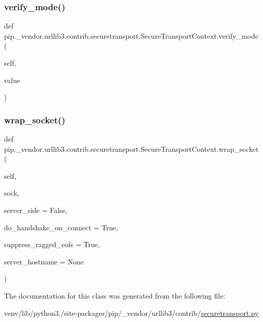 \subsubsection{\texorpdfstring{verify\+\_\+mode()}{verify\_mode()}\hspace{0.1cm}{\footnotesize\ttfamily [2/2]}}
{\footnotesize\ttfamily def pip.\+\_\+vendor.\+urllib3.\+contrib.\+securetransport.\+Secure\+Transport\+Context.\+verify\+\_\+mode (\begin{DoxyParamCaption}\item[{}]{self,  }\item[{}]{value }\end{DoxyParamCaption})}

\mbox{\label{classpip_1_1__vendor_1_1urllib3_1_1contrib_1_1securetransport_1_1SecureTransportContext_a0d4b10fc19b24ab873ace5e8804a5729}} 
\subsubsection{\texorpdfstring{wrap\+\_\+socket()}{wrap\_socket()}}
{\footnotesize\ttfamily def pip.\+\_\+vendor.\+urllib3.\+contrib.\+securetransport.\+Secure\+Transport\+Context.\+wrap\+\_\+socket (\begin{DoxyParamCaption}\item[{}]{self,  }\item[{}]{sock,  }\item[{}]{server\+\_\+side = {\ttfamily False},  }\item[{}]{do\+\_\+handshake\+\_\+on\+\_\+connect = {\ttfamily True},  }\item[{}]{suppress\+\_\+ragged\+\_\+eofs = {\ttfamily True},  }\item[{}]{server\+\_\+hostname = {\ttfamily None} }\end{DoxyParamCaption})}



The documentation for this class was generated from the following file\+:\begin{DoxyCompactItemize}
\item 
venv/lib/python3./site-\/packages/pip/\+\_\+vendor/urllib3/contrib/\hyperlink{securetransport_8py}{securetransport.\+py}\end{DoxyCompactItemize}
